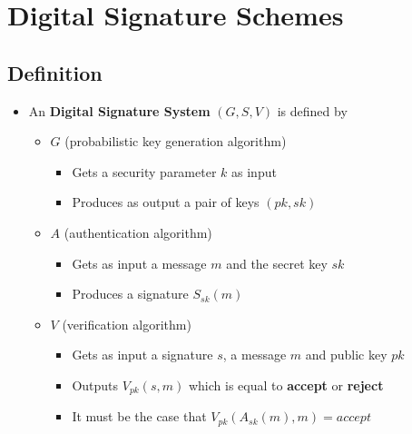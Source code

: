 \section{Digital Signature Schemes}
\subsection{Definition}
\begin{itemize}
  \item An \textbf{Digital Signature System} $(G,S,V)$ is defined by
  \begin{itemize}
  	\item $G$ (probabilistic key generation algorithm)
    \begin{itemize}
  		\item Gets a security parameter $k$ as input
  		\item Produces as output a pair of keys $(pk, sk)$
    \end{itemize}
  	\item $A$ (authentication algorithm)
    \begin{itemize}
  		\item Gets as input a message $m$ and the secret key $sk$
  		\item Produces a signature $S_{sk}(m)$
    \end{itemize}
  	\item $V$ (verification algorithm)
    \begin{itemize}
  		\item Gets as input a signature $s$, a message $m$ and public key $pk$
  		\item Outputs $V_{pk}(s,m)$ which is equal to \textbf{accept} or \textbf{reject}
  		\item It must be the case that $V_{pk}(A_{sk}(m),m) = accept$
    \end{itemize}
  \end{itemize}


\end{itemize}
